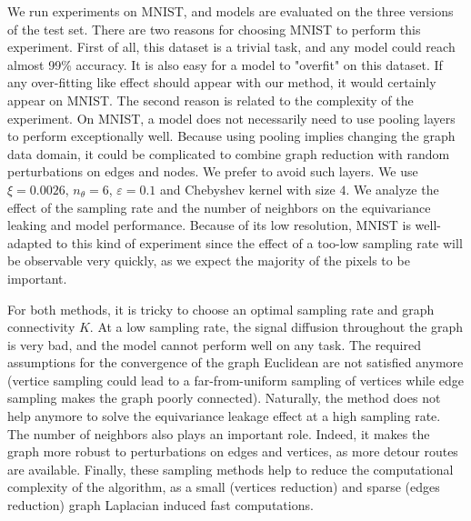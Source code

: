 \documentclass{article}
\begin{document}
We run experiments on MNIST, and models are evaluated on the three versions of the test set. There are two reasons for choosing MNIST to perform this experiment. First of all, this dataset is a trivial task, and any model could reach almost 99\% accuracy. It is also easy for a model to "overfit" on this dataset. If any over-fitting like effect should appear with our method, it would certainly appear on MNIST. The second reason is related to the complexity of the experiment. On MNIST, a model does not necessarily need to use pooling layers to perform exceptionally well. Because using pooling implies changing the graph data domain, it could be complicated to combine graph reduction with random perturbations on edges and nodes. We prefer to avoid such layers. We use $\xi = 0.0026$, $n_\theta = 6$, $\varepsilon = 0.1$ and Chebyshev kernel with size $4$. We analyze the effect of the sampling rate and the number of neighbors on the equivariance leaking and model performance. Because of its low resolution, MNIST is well-adapted to this kind of experiment since the effect of a too-low sampling rate will be observable very quickly, as we expect the majority of the pixels to be important.




For both methods, it is tricky to choose an optimal sampling rate and graph connectivity $K$. At a low sampling rate, the signal diffusion throughout the graph is very bad, and the model cannot perform well on any task. The required assumptions for the convergence of the graph Euclidean are not satisfied anymore (vertice sampling could lead to a far-from-uniform sampling of vertices while edge sampling makes the graph poorly connected). Naturally, the method does not help anymore to solve the equivariance leakage effect at a high sampling rate. The number of neighbors also plays an important role. Indeed, it makes the graph more robust to perturbations on edges and vertices, as more detour routes are available. Finally, these sampling methods help to reduce the computational complexity of the algorithm, as a small (vertices reduction) and sparse (edges reduction) graph Laplacian induced fast computations.
\end{document}
